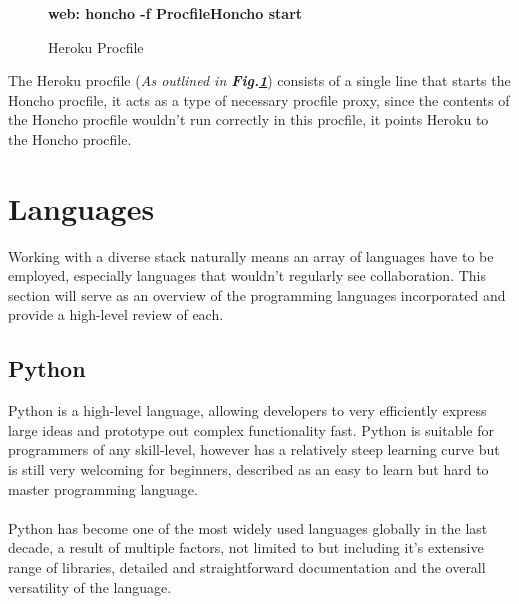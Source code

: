 \begin{figure}[H]
    \centering
    \textbf{web: honcho -f ProcfileHoncho start}
    \caption{Heroku Procfile}
    \label{image:herokuProcfile}
\end{figure}

The Heroku procfile (\textit{As outlined in \textbf{Fig.\ref{image:herokuProcfile}}}) consists of a single line that starts the Honcho procfile, it acts as a type of necessary procfile proxy, since the contents of the Honcho procfile wouldn't run correctly in this procfile, it points Heroku to the Honcho procfile.

\begin{center}

\end{center}

\section{Languages}
Working with a diverse stack naturally means an array of languages have to be employed, especially languages that wouldn't regularly see collaboration. This section will serve as an overview of the programming languages incorporated and provide a high-level review of each.

\subsection{Python}
Python is a high-level language, allowing developers to very efficiently express large ideas and prototype out complex functionality fast. Python is suitable for programmers of any skill-level, however has a relatively steep learning curve but is still very welcoming for beginners, described as an easy to learn but hard to master programming language.

\paragraph{}
Python has become one of the most widely used languages globally in the last decade, a result of multiple factors, not limited to but including it's extensive range of libraries, detailed and straightforward documentation \cite{PYTHON} and the overall versatility of the language.

\paragraph{}

